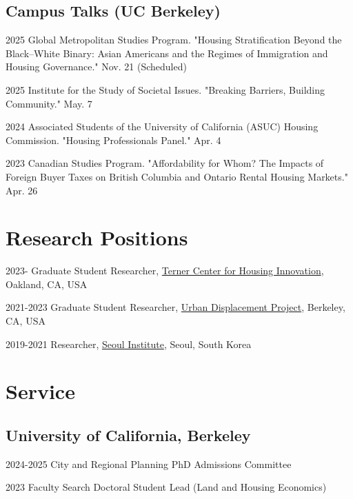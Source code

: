 \documentclass[11pt,letterpaper]{report}
\begin{document}
\subsection*{Campus Talks (UC Berkeley)}
\begin{tablist}
\item[2025] \tab{}Global Metropolitan Studies Program. "Housing Stratification Beyond the Black–White Binary: Asian Americans and the Regimes of Immigration and Housing Governance." Nov. 21 (Scheduled)
\item[2025] \tab{}Institute for the Study of Societal Issues. "Breaking Barriers, Building Community." May. 7
\item[2024] \tab{}Associated Students of the University of California (ASUC) Housing Commission. "Housing Professionals Panel." Apr. 4
\item[2023] \tab{}Canadian Studies Program. "Affordability for Whom? The Impacts of Foreign Buyer Taxes on British Columbia and Ontario Rental Housing Markets." Apr. 26
\end{tablist}

\section*{Research Positions}
\begin{tablist}
\item[2023-] \tab{}Graduate Student Researcher, \href{https://ternercenter.berkeley.edu/}{Terner Center for Housing Innovation}, Oakland, CA, USA
\item[2021-2023] \tab{}Graduate Student Researcher, \href{https://www.urbandisplacement.org/}{Urban Displacement Project}, Berkeley, CA, USA
\item[2019-2021] \tab{}Researcher, \href{si.re.kr}{Seoul Institute}, Seoul, South Korea
\end{tablist}

\section*{Service}
\subsection*{University of California, Berkeley}
\begin{tablist}
\item[2024-2025] \tab{}City and Regional Planning PhD Admissions Committee
\item[2023] \tab{}Faculty Search Doctoral Student Lead (Land and Housing Economics)
\end{tablist}
\end{document}
